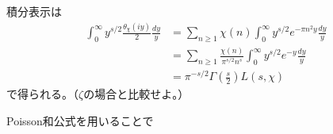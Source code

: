\documentclass[uplatex, a4paper]{jsbook}
\begin{document}
積分表示は
\begin{align*}
  \int^\infty_0y^{s/2}\frac{\theta_\chi(iy)}{2}\frac{dy}{y}
  &=\sum_{n\geq1}\chi(n)\int^\infty_0y^{s/2}e^{-\pi n^2y}\frac{dy}{y}\\
  &=\sum_{n\geq1}\frac{\chi(n)}{\pi^{s/2}n^s}\int^\infty_0y^{s/2}e^{-y}\frac{dy}{y}\\
  &=\pi^{-s/2}\Gamma(\frac{s}{2})L(s,\chi)
\end{align*}
で得られる。（$\zeta$の場合と比較せよ。）

Poisson和公式を用いることで
  
\end{document}
